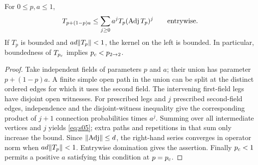 \begin{lemma}[Sprinkling]\label{pre:sprinkling}
For $0\le p,a\le1$,
\begin{equation}\label{eq:s05}
 T_{p+(1-p)a}
 \le\sum_{j\ge0}a^jT_p(\operatorname{Adj} T_p)^j
 \qquad\text{entrywise}.
\end{equation}
If $T_p$ is bounded and $ad\lVert T_p\rVert<1$, the kernel on the left is
bounded. In particular, boundedness of $T_{p_c}$ implies
${p_c}<{p_{2\to2}}$.
\end{lemma}
\begin{proof}
Take independent fields of parameters $p$ and $a$; their union has
parameter $p+(1-p)a$. A finite simple open path in the union can be
split at the distinct ordered edges for which it uses the second
field. The intervening first-field legs have disjoint open witnesses.
For prescribed legs and $j$ prescribed second-field edges, independence
and the disjoint-witness inequality give the corresponding product
of $j+1$ connection probabilities times $a^j$. Summing over all
intermediate vertices and $j$ yields \eqref{eq:s05}; extra paths and
repetitions in that sum only increase the bound. Since
$\lVert\operatorname{Adj}\rVert\le d$, the right-hand series converges in operator norm
when $ad\lVert T_p\rVert<1$. Entrywise domination gives the assertion.
Finally ${p_c}<1$ permits a positive $a$ satisfying this condition at
$p={p_c}$.
\end{proof}
